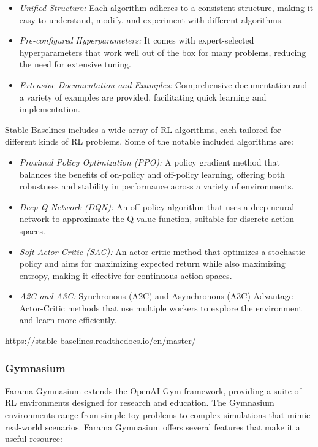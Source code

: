 \begin{itemize}
    \item \emph{Unified Structure:} Each algorithm adheres to a consistent structure, making it easy to understand, modify, and experiment with different algorithms.
    \item \emph{Pre-configured Hyperparameters:} It comes with expert-selected hyperparameters that work well out of the box for many problems, reducing the need for extensive tuning.
    \item \emph{Extensive Documentation and Examples:} Comprehensive documentation and a variety of examples are provided, facilitating quick learning and implementation.
\end{itemize}

Stable Baselines includes a wide array of RL algorithms, each tailored for different kinds of RL problems. Some of the notable included algorithms are:

\begin{itemize}
    \item \emph{Proximal Policy Optimization (PPO):} A policy gradient method that balances the benefits of on-policy and off-policy learning, offering both robustness and stability in performance across a variety of environments.
    \item \emph{Deep Q-Network (DQN):} An off-policy algorithm that uses a deep neural network to approximate the Q-value function, suitable for discrete action spaces.
    \item \emph{Soft Actor-Critic (SAC):} An actor-critic method that optimizes a stochastic policy and aims for maximizing expected return while also maximizing entropy, making it effective for continuous action spaces.
    \item \emph{A2C and A3C:} Synchronous (A2C) and Asynchronous (A3C) Advantage Actor-Critic methods that use multiple workers to explore the environment and learn more efficiently.
\end{itemize}

\begin{tcolorbox}[colback=code]
\small
\url{https://stable-baselines.readthedocs.io/en/master/}
\normalsize
\end{tcolorbox}

\subsubsection*{Gymnasium}

Farama Gymnasium extends the OpenAI Gym framework, providing a suite of RL environments designed for research and education. The Gymnasium environments range from simple toy problems to complex simulations that mimic real-world scenarios. Farama Gymnasium offers several features that make it a useful resource:

